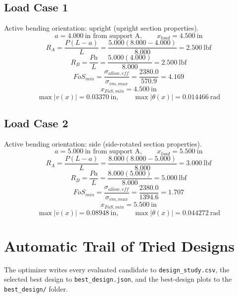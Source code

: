 \documentclass[11pt]{article}
\begin{document}
\subsection*{Load Case 1}
Active bending orientation: upright (upright section properties).
\[a = 4.000\ \mathrm{in} \text{ from support A}, \qquad x_{load} = 4.500\ \mathrm{in}\]
\[R_A = \frac{P(L-a)}{L} = \frac{5.000(8.000-4.000)}{8.000} = 2.500\ \mathrm{lbf}\]
\[R_B = \frac{Pa}{L} = \frac{5.000(4.000)}{8.000} = 2.500\ \mathrm{lbf}\]
\[FoS_{min} = \frac{\sigma_{allow,eff}}{\sigma_{vm,max}} = \frac{2380.0}{570.9} = 4.169\]
\[x_{FoS,min} = 4.500\ \mathrm{in}\]
\[\max |v(x)| = 0.03370\ \mathrm{in}, \qquad \max |\theta(x)| = 0.014466\ \mathrm{rad}\]
\subsection*{Load Case 2}
Active bending orientation: side (side-rotated section properties).
\[a = 5.000\ \mathrm{in} \text{ from support A}, \qquad x_{load} = 5.500\ \mathrm{in}\]
\[R_A = \frac{P(L-a)}{L} = \frac{8.000(8.000-5.000)}{8.000} = 3.000\ \mathrm{lbf}\]
\[R_B = \frac{Pa}{L} = \frac{8.000(5.000)}{8.000} = 5.000\ \mathrm{lbf}\]
\[FoS_{min} = \frac{\sigma_{allow,eff}}{\sigma_{vm,max}} = \frac{2380.0}{1394.6} = 1.707\]
\[x_{FoS,min} = 5.500\ \mathrm{in}\]
\[\max |v(x)| = 0.08948\ \mathrm{in}, \qquad \max |\theta(x)| = 0.044272\ \mathrm{rad}\]

\section*{Automatic Trail of Tried Designs}
The optimizer writes every evaluated candidate to \texttt{design\_study.csv}, the selected best design to \texttt{best\_design.json}, and the best-design plots to the \texttt{best\_design/} folder.
\end{document}
